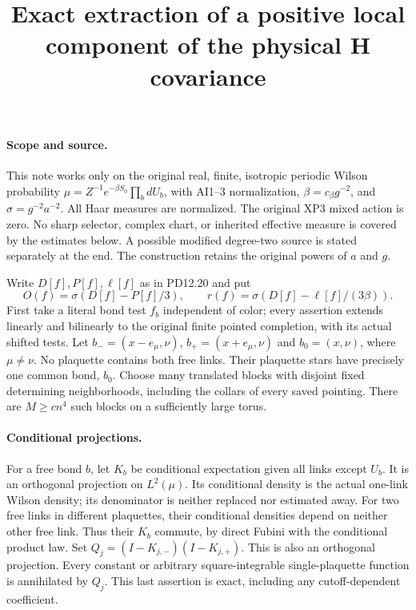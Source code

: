 \documentclass[11pt]{article}
\title{Exact extraction of a positive local component of the physical H covariance}\author{}\date{}
\begin{document}
\maketitle
\paragraph{Scope and source.}
This note works only on the original real, finite, isotropic periodic Wilson probability
$\mu=Z^{-1}e^{-\beta S_0}\prod_b dU_b$, with AI1--3 normalization,
$\beta=c_\beta g^{-2}$, and $\sigma=g^{-2}a^{-2}$.
All Haar measures are normalized. The original XP3 mixed action is zero.
No sharp selector, complex chart, or inherited effective measure is covered by the estimates below.
A possible modified degree-two source is stated separately at the end.
The construction retains the original powers of $a$ and $g$.

Write $D[f],P[f],\ell[f]$ as in PD12.20 and put
\[
 O(f)=\sigma(D[f]-P[f]/3),\qquad
 r(f)=\sigma(D[f]-\ell[f]/(3\beta)).
\]
First take a literal bond test $f_b$ independent of color; every assertion extends linearly
and bilinearly to the original finite pointed completion, with its actual shifted tests.
Let $b_-=(x-e_\mu,\nu)$, $b_+=(x+e_\mu,\nu)$ and $b_0=(x,\nu)$,
where $\mu\ne\nu$. No plaquette contains both free links. Their plaquette stars
have precisely one common bond, $b_0$. Choose many translated blocks with disjoint
fixed determining neighborhoods, including the collars of every saved pointing.
There are $M\ge c n^4$ such blocks on a sufficiently large torus.

\paragraph{Conditional projections.}
For a free bond $b$, let $K_b$ be conditional expectation given all links except $U_b$.
It is an orthogonal projection on $L^2(\mu)$. Its conditional density is the actual
one-link Wilson density; its denominator is neither replaced nor estimated away.
For two free links in different plaquettes, their conditional densities depend on neither
other free link. Thus their $K_b$ commute, by direct Fubini with the conditional product law.
Set $Q_j=(I-K_{j,-})(I-K_{j,+})$. This is also an orthogonal projection.
Every constant or arbitrary square-integrable single-plaquette function is annihilated by $Q_j$.
This last assertion is exact, including any cutoff-dependent coefficient.
\end{document}
